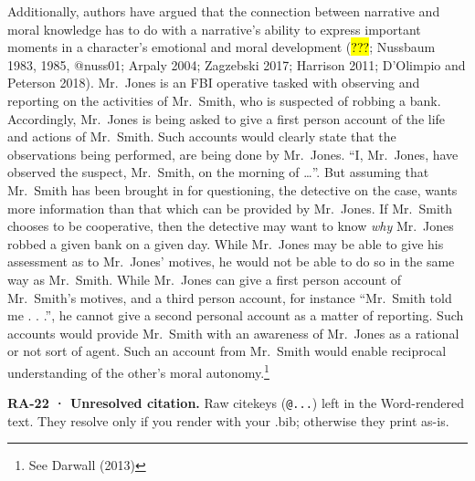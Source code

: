 \documentclass[
  letterpaper,
  DIV=11,
  numbers=noendperiod]{scrartcl}
\theoremstyle{remark}
\begin{document}
Additionally, authors have argued that the connection between narrative
and moral knowledge has to do with a narrative's ability to express
important moments in a character's emotional and moral development
(\hl{???}; Nussbaum 1983, 1985, @nuss01; Arpaly 2004; Zagzebski 2017;
Harrison 2011; D'Olimpio and Peterson 2018). Mr.~Jones is an FBI
operative tasked with observing and reporting on the activities of
Mr.~Smith, who is suspected of robbing a bank. Accordingly, Mr.~Jones is
being asked to give a first person account of the life and actions of
Mr.~Smith. Such accounts would clearly state that the observations being
performed, are being done by Mr.~Jones. ``I, Mr.~Jones, have observed
the suspect, Mr.~Smith, on the morning of \ldots''. But assuming that
Mr.~Smith has been brought in for questioning, the detective on the
case, wants more information than that which can be provided by
Mr.~Jones. If Mr.~Smith chooses to be cooperative, then the detective
may want to know \emph{why} Mr.~Jones robbed a given bank on a given
day. While Mr.~Jones may be able to give his assessment as to Mr.~Jones'
motives, he would not be able to do so in the same way as Mr.~Smith.
While Mr.~Jones can give a first person account of Mr.~Smith's motives,
and a third person account, for instance ``Mr.~Smith told me . . .'', he
cannot give a second personal account as a matter of reporting. Such
accounts would provide Mr.~Smith with an awareness of Mr.~Jones as a
rational or not sort of agent. Such an account from Mr.~Smith would
enable reciprocal understanding of the other's moral
autonomy.\footnote{See Darwall (2013)}

\begin{tcolorbox}[enhanced jigsaw, arc=.35mm, bottomrule=.15mm, bottomtitle=1mm, breakable, colback=white, colbacktitle=quarto-callout-warning-color!10!white, colframe=quarto-callout-warning-color-frame, coltitle=black, left=2mm, leftrule=.75mm, opacityback=0, opacitybacktitle=0.6, rightrule=.15mm, title=\textcolor{quarto-callout-warning-color}{\faExclamationTriangle}\hspace{0.5em}{Warning}, titlerule=0mm, toprule=.15mm, toptitle=1mm]

\textbf{RA-22 · Unresolved citation.} Raw citekeys (\texttt{@...}) left
in the Word-rendered text. They resolve only if you render with your
.bib; otherwise they print as-is.

\end{tcolorbox}
\end{document}
